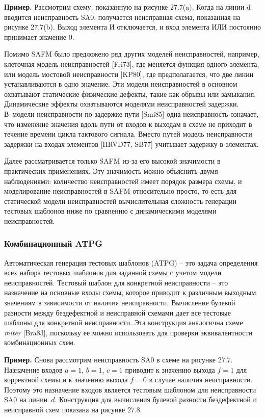 \textbf{Пример.}
Рассмотрим схему, показанную на рисунке 27.7(a). Когда на линии d вводится неисправность SA0, получается неисправная схема, показанная на рисунке 27.7(b). Выход элемента И отключается, и вход элемента ИЛИ постоянно принимает значение 0.

Помимо SAFM было предложено ряд других моделей неисправностей, например, клеточная модель неисправностей [Fri73], где меняется функция одного элемента, или модель мостовой неисправности [KP80], где предполагается, что две линии устанавливаются в одно значение.
Эти модели неисправностей в основном охватывают статические физические дефекты, такие как обрывы или замыкания.
Динамические эффекты охватываются моделями неисправностей задержки.
В~модели неисправности по задержке пути [Smi85] одна неисправность означает, что изменение значения вдоль пути от входов к выходам в схеме не приходит в течение времени цикла тактового сигнала.
Вместо путей модель неисправности задержки на входах элементов [HRVD77, SB77] учитывает задержку в элементах.

Далее рассматривается только SAFM из-за его высокой значимости в практических применениях.
Эту значимость можно объяснить двумя наблюдениями: количество неисправностей имеет порядок размера схемы, и моделирование неисправностей в SAFM относительно просто, то есть для статической модели неисправностей вычислительная сложность генерации тестовых шаблонов ниже по сравнению с динамическими моделями неисправностей.

\subsubsection{Комбинационный ATPG}

Автоматическая генерация тестовых шаблонов (ATPG) \--- это задача определения всех набора тестовых шаблонов для заданной схемы с учетом модели неисправностей.
Тестовый шаблон для конкретной неисправности \--- это назначение на основные входы схемы, которое приводит к различным выходным значениям в зависимости от наличия неисправности.
Вычисление булевой разности между бездефектной и неисправной схемами дает все тестовые шаблоны для конкретной неисправности.
Эта конструкция аналогична схеме \textit{miter} [Bra83], поскольку ее можно использовать для проверки эквивалентности комбинационных схем.

\textbf{Пример.}
Снова рассмотрим неисправность SA0 в схеме на рисунке 27.7.
Назначение входов $a = 1$, $b = 1$, $c = 1$ приводит к значению выхода $f = 1$ для корректной схемы и к значению выхода $f = 0$ в случае наличия неисправности.
Поэтому это назначение входов является тестовым шаблоном для неисправности SA0 на линии~$d$.
Конструкция для вычисления булевой разности бездефектной и неисправной схем показана на рисунке 27.8.


